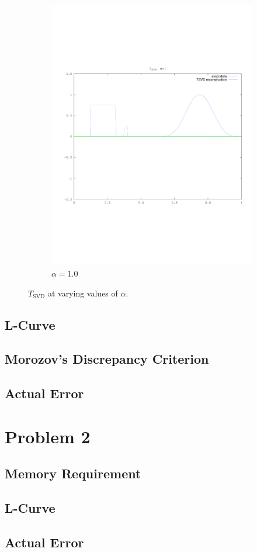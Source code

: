 \documentclass{article}
\begin{document}
\begin{figure}
\begin{subfigure}[b]{0.3\textwidth}
                \includegraphics[width=\textwidth]{plots/tsvd1.pdf}
                \caption{$\alpha=1.0$}
        \end{subfigure}
        \caption{$T_{\text{SVD}}$ at varying values of $\alpha$.}
\end{figure}


\subsection{L-Curve}


\subsection{Morozov's Discrepancy Criterion}


\subsection{Actual Error}


\newpage
\section{Problem 2}


\subsection{Memory Requirement}


\subsection{L-Curve}


\subsection{Actual Error}
\end{document}
